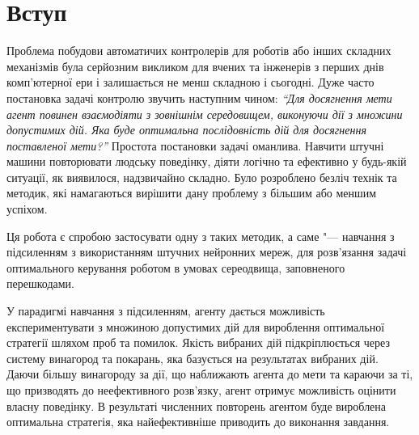 \newpage

\section{Вступ}

Проблема побудови автоматичих контролерів для роботів або інших складних механізмів була серйозним викликом для вчених та інженерів з перших днів комп'ютерної ери і залишається не менш складною і сьогодні. Дуже часто постановка задачі контролю звучить наступним чином: \emph{``Для досягнення мети агент повинен взаємодіяти з зовнішнім середовищем, виконуючи дії з множини допустимих дій. Яка буде оптимальна послідовність дій для досягнення поставленої мети?''} Простота постановки задачі оманлива. Навчити штучні машини повторювати людську поведінку, діяти логічно та ефективно у будь-якій ситуації, як виявилося, надзвичайно складно. Було розроблено безліч технік та методик, які намагаються вирішити дану проблему з більшим або меншим успіхом.

Ця робота є спробою застосувати одну з таких методик, а саме "--- навчання з підсиленням з використанням штучних нейронних мереж, для розв'язання задачі оптимального керування роботом в умовах сереодвища, заповненого перешкодами.

У парадигмі навчання з підсиленням, агенту дається можливість експериментувати з множиною допустимих дій для вироблення оптимальної стратегії шляхом проб та помилок. Якість вибраних дій підкріплюється через систему винагород та покарань, яка базується на результатах вибраних дій. Даючи більшу винагороду за дії, що наближають агента до мети та караючи за ті, що призводять до неефективного розв'язку, агент отримує можливість оцінити власну поведінку. В результаті численних повторень агентом буде вироблена оптимальна стратегія, яка найефективніше приводить до виконання завдання.

